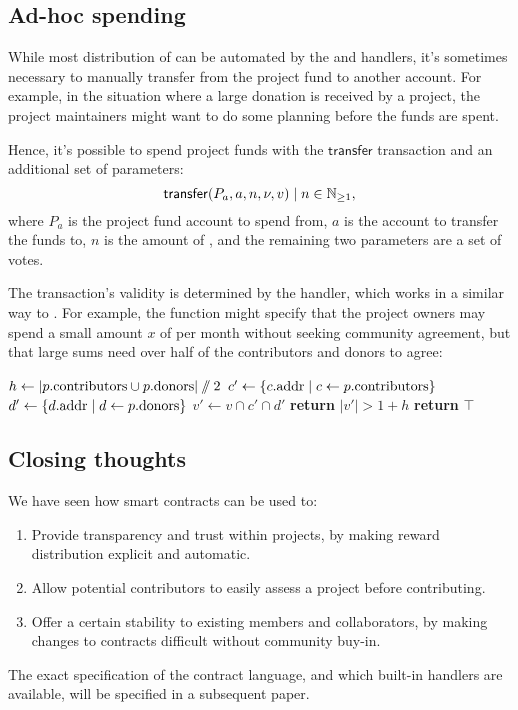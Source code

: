 \subsection{Ad-hoc spending}

While most distribution of \oscoin{} can be automated by the 
and  handlers, it's sometimes necessary to manually
transfer \oscoin{} from the project fund to another account. For example, in
the situation where a large donation is received by a project, the project
maintainers might want to do some planning before the funds are spent.

Hence, it's possible to spend project funds with the $\mathsf{transfer}$
transaction and an additional set of parameters:
\[
    \mathsf{transfer}\lparen P_a, a, n, \nu, v\rparen \mid n \in \mathbb{N}_{\geq 1},
\]
where $P_a$ is the project fund account to spend from, $a$ is the account to
transfer the funds to, $n$ is the amount of \oscoin{}, and the remaining two
parameters are a set of votes.

The transaction's validity is determined by the  handler,
which works in a similar way to . For
example, the function might specify that the project owners may spend a small
amount $x$ of \oscoin{} per month without seeking community agreement, but that
large sums need over half of the contributors and donors to agree:
\medskip
\begin{algorithmic}[0]
            \State $h \gets |p.{\mathrm{contributors}} \cup p.{\mathrm{donors}}| \sslash 2$
            \State $c' \gets \{ c.{\mathrm{addr}} \mid c \gets p.{\mathrm{contributors}} \}$
            \State $d' \gets \{ d.{\mathrm{addr}} \mid d \gets p.{\mathrm{donors}} \}$
            \State $v' \gets v \cap c' \cap d'$
            \State \textbf{return} $|v'| > 1 + h$
            \Else
            \State \textbf{return} $\top$
        \EndIf
    \EndProcedure
\end{algorithmic}

\subsection{Closing thoughts}

We have seen how smart contracts can be used to:

\begin{enumerate}
    \item Provide transparency and trust within projects, by making reward
        distribution explicit and automatic.
    \item Allow potential contributors to easily assess a project before contributing.
    \item Offer a certain stability to existing members and collaborators, by
        making changes to contracts difficult without community buy-in.
\end{enumerate}

The exact specification of the contract language, and which built-in handlers
are available, will be specified in a subsequent paper.
